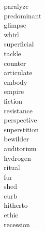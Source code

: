 \documentclass[a4paper, 11pt]{ctexart}
\begin{document}
\begin{multicols*}{3}
\begin{description}
\item[paralyze]

\item[predominant]

\item[glimpse]

\item[whirl]

\item[superficial]

\item[tackle]

\item[counter]

\item[articulate]

\item[embody]

\item[empire]

\item[fiction]

\item[resistance]

\item[perspective]

\item[superstition]

\item[bewilder]

\item[auditorium]

\item[hydrogen]

\item[ritual]

\item[fur]

\item[shed]

\item[curb]

\item[hitherto]

\item[ethic]

\item[recession]

    \end{description}
\end{multicols*}
\end{document}
